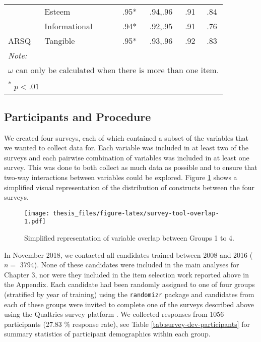 \documentclass[
  12pt,
  a4paper,
]{book}
\begin{document}
\begin{table}
\begin{tabular}[t]{llrcccc}
\cmidrule{2-2}
\cmidrule{4-7}
 & Esteem &  & .95* & .94,.96 & .91 & .84\\
\cmidrule{2-2}
\cmidrule{4-7}
 & Informational &  & .94* & .92,.95 & .91 & .76\\
\cmidrule{2-2}
\cmidrule{4-7}
\multirow[t]{-4}{*}{\raggedright\arraybackslash ARSQ} & Tangible & \multirow[t]{-8}{*}{\raggedleft\arraybackslash 219} & .95* & .93,.96 & .92 & .83\\
\bottomrule
\multicolumn{7}{l}{\textit{Note: }}\\
\multicolumn{7}{l}{$\omega$ can only be calculated when there is more than one item.}\\
\multicolumn{7}{l}{\textsuperscript{*} $p<.01$}\\
\end{tabular}
\end{table}

\hypertarget{survey-tool-dev-participants}{%
\subsection{Participants and Procedure}\label{survey-tool-dev-participants}}

We created four surveys, each of which contained a subset of the variables that we wanted to collect data for. Each variable was included in at least two of the surveys and each pairwise combination of variables was included in at least one survey. This was done to both collect as much data as possible and to ensure that two-way interactions between variables could be explored. Figure \ref{fig:survey-tool-overlap} shows a simplified visual representation of the distribution of constructs between the four surveys.

\begin{figure}
\centering
\texttt{[image: thesis\_files/figure-latex/survey-tool-overlap-1.pdf]}
\caption{\label{fig:survey-tool-overlap}Simplified representation of variable overlap between Groups 1 to 4.}
\end{figure}

In November 2018, we contacted all candidates trained between 2008 and 2016 (\(n =\) 3794). None of these candidates were included in the main analyses for Chapter 3, nor were they included in the item selection work reported above in the Appendix. Each candidate had been randomly assigned to one of four groups (stratified by year of training) using the \texttt{randomizr} package \citep{R-randomizr} and candidates from each of these groups were invited to complete one of the surveys described above using the Qualtrics survey platform \citep{Qualtrics}. We collected responses from 1056 participants (27.83 \% response rate), see Table \ref{tab:survey-dev-participants} for summary statistics of participant demographics within each group.
\end{document}
